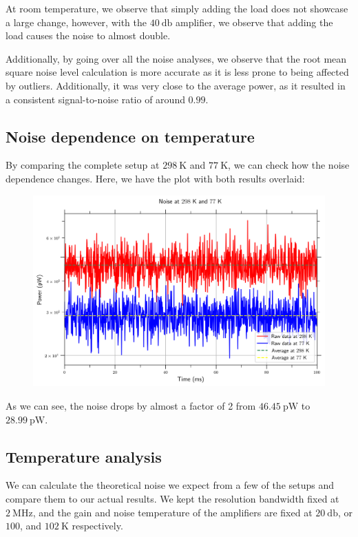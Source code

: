\documentclass[english,12pt,a4paper]{article}
\begin{document}
At room temperature, we observe that simply adding the load does not showcase a large change, however, with the $\qty{40}{\decibel}$ amplifier, we observe that adding the load causes the noise to almost double.

Additionally, by going over all the noise analyses, we observe that the root mean square noise level calculation is more accurate as it is less prone to being affected by outliers. Additionally, it was very close to the average power, as it resulted in a consistent signal-to-noise ratio of around $0.99$.

\subsection{Noise dependence on temperature}
By comparing the complete setup at $\qty{298}{\kelvin}$ and $\qty{77}{\kelvin}$, we can check how the noise dependence changes. Here, we have the plot with both results overlaid:

\begin{figure}[H]
	\includegraphics[width=1\linewidth]{Plots/comparison}
	\caption{}
	\label{fig:comparison}
\end{figure}

As we can see, the noise drops by almost a factor of 2 from $\qty{46.45}{\pico\watt}$ to $\qty{28.99}{\pico\watt}$.


\subsection{Temperature analysis}

We can calculate the theoretical noise we expect from a few of the setups and compare them to our actual results. We kept the resolution bandwidth fixed at $\qty{2}{\mega\hertz}$, and the gain and noise temperature of the amplifiers are fixed at $\qty{20}{\decibel}$, or $100$, and $\qty{102}{\kelvin}$ respectively.
\end{document}
